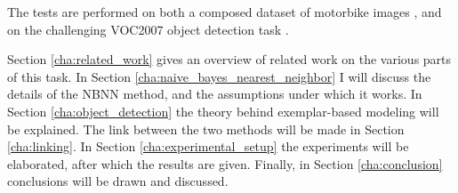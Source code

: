 The tests are performed on both a composed dataset of motorbike images \cite{becker2012codebook}, and on the challenging VOC2007 object detection task \cite{pascal-voc-2007}.


Section \ref{cha:related_work} gives an overview of related work on the various parts of this task. In Section \ref{cha:naive_bayes_nearest_neighbor} I will discuss the details of the NBNN method, and the assumptions under which it works. In Section \ref{cha:object_detection} the theory behind exemplar-based modeling will be explained. The link between the two methods will be made in Section \ref{cha:linking}. In Section \ref{cha:experimental_setup} the experiments will be elaborated, after which the results are given. Finally, in Section \ref{cha:conclusion} conclusions will be drawn and discussed.

